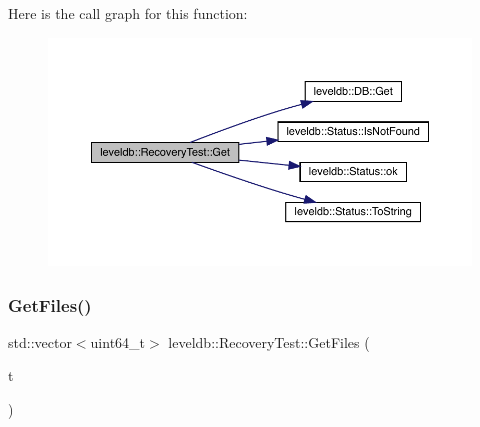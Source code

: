 Here is the call graph for this function\+:
\nopagebreak
\begin{figure}[H]
\begin{center}
\leavevmode
\includegraphics[width=350pt]{classleveldb_1_1_recovery_test_a296ba88823b34d714bb7c74ed6d83810_cgraph}
\end{center}
\end{figure}
\mbox{\label{classleveldb_1_1_recovery_test_a547c06a2c905b46cbb86a793609c28fd}} 
\subsubsection{\texorpdfstring{GetFiles()}{GetFiles()}}
{\footnotesize\ttfamily std\+::vector$<$uint64\+\_\+t$>$ leveldb\+::\+Recovery\+Test\+::\+Get\+Files (\begin{DoxyParamCaption}\item[{\mbox{\hyperlink{namespaceleveldb_ab8e559ac5cadcb2b5dd531c60df944f1}{File\+Type}}}]{t }\end{DoxyParamCaption})\hspace{0.3cm}{\ttfamily [inline]}}

